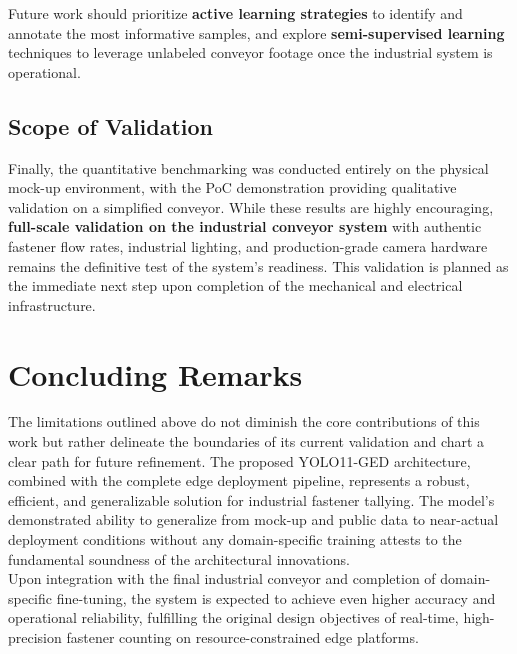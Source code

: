 Future work should prioritize \textbf{active learning strategies} to identify and annotate the most informative samples, and explore \textbf{semi-supervised learning} techniques to leverage unlabeled conveyor footage once the industrial system is operational.

\subsection{Scope of Validation}

Finally, the quantitative benchmarking was conducted entirely on the physical mock-up environment, with the PoC demonstration providing qualitative validation on a simplified conveyor. While these results are highly encouraging, \textbf{full-scale validation on the industrial conveyor system} with authentic fastener flow rates, industrial lighting, and production-grade camera hardware remains the definitive test of the system's readiness. This validation is planned as the immediate next step upon completion of the mechanical and electrical infrastructure.\\

\section{Concluding Remarks}

The limitations outlined above do not diminish the core contributions of this work but rather delineate the boundaries of its current validation and chart a clear path for future refinement. The proposed YOLO11-GED architecture, combined with the complete edge deployment pipeline, represents a robust, efficient, and generalizable solution for industrial fastener tallying. The model's demonstrated ability to generalize from mock-up and public data to near-actual deployment conditions without any domain-specific training attests to the fundamental soundness of the architectural innovations.\\

Upon integration with the final industrial conveyor and completion of domain-specific fine-tuning, the system is expected to achieve even higher accuracy and operational reliability, fulfilling the original design objectives of real-time, high-precision fastener counting on resource-constrained edge platforms.